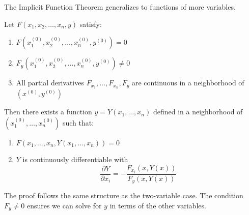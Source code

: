 \documentclass[11pt]{report}
\begin{document}
The Implicit Function Theorem generalizes to functions of more variables.

\begin{theorem}
Let $F(x_1, x_2, \ldots, x_n, y)$ satisfy:
\begin{enumerate}[label=(\roman*)]
    \item $F(x_1^{(0)}, x_2^{(0)}, \ldots, x_n^{(0)}, y^{(0)}) = 0$
    \item $F_y(x_1^{(0)}, x_2^{(0)}, \ldots, x_n^{(0)}, y^{(0)}) \neq 0$
    \item All partial derivatives $F_{x_1}, \ldots, F_{x_n}, F_y$ are continuous in a neighborhood of $(x^{(0)}, y^{(0)})$
\end{enumerate}

Then there exists a function $y = Y(x_1, \ldots, x_n)$ defined in a neighborhood of $(x_1^{(0)}, \ldots, x_n^{(0)})$ such that:
\begin{enumerate}[label=(\alph*)]
    \item $F(x_1, \ldots, x_n, Y(x_1, \ldots, x_n)) = 0$
    \item $Y$ is continuously differentiable with
    \[
    \frac{\partial Y}{\partial x_i} = -\frac{F_{x_i}(x, Y(x))}{F_y(x, Y(x))}
    \]
\end{enumerate}
\end{theorem}

\begin{remark}
The proof follows the same structure as the two-variable case. The condition $F_y \neq 0$ ensures we can solve for $y$ in terms of the other variables.
\end{remark}
\end{document}

